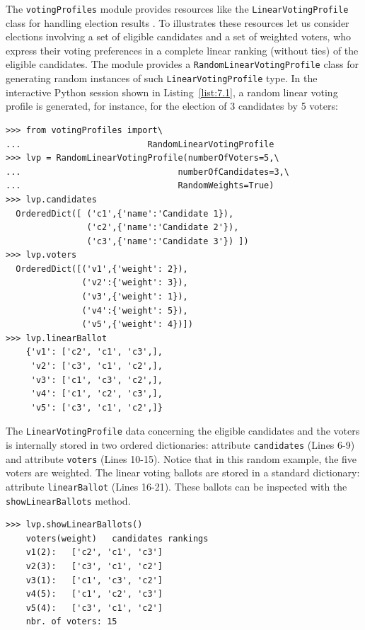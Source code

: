 The \texttt{votingProfiles} module provides resources like the \texttt{LinearVoting\-Profile} class for handling election results \citep{ADT-L2}. To illustrates these resources let us consider elections involving a set of eligible candidates and a set of weighted voters, who express their voting preferences in a complete linear ranking (without ties) of the eligible candidates. The module provides a \texttt{RandomLinear\-VotingProfile} class  for generating random instances of such \texttt{LinearVot\-ingProfile} type. In the interactive Python session shown in Listing~\vref{list:7.1}, a random linear voting profile is generated, for instance, for the election of 3 candidates by 5 voters:
\begin{lstlisting}[caption={Example of random linear voting profile},label=list:7.1]
>>> from votingProfiles import\
...                         RandomLinearVotingProfile
>>> lvp = RandomLinearVotingProfile(numberOfVoters=5,\
...                               numberOfCandidates=3,\
...                               RandomWeights=True) 
>>> lvp.candidates
  OrderedDict([ ('c1',{'name':'Candidate 1}),
                ('c2',{'name':'Candidate 2'}),
                ('c3',{'name':'Candidate 3'}) ])
>>> lvp.voters
  OrderedDict([('v1',{'weight': 2}),
               ('v2':{'weight': 3}), 
               ('v3',{'weight': 1}),
               ('v4':{'weight': 5}),
               ('v5',{'weight': 4})])
>>> lvp.linearBallot
    {'v1': ['c2', 'c1', 'c3',],
     'v2': ['c3', 'c1', 'c2',],
     'v3': ['c1', 'c3', 'c2',],
     'v4': ['c1', 'c2', 'c3',],
     'v5': ['c3', 'c1', 'c2',]} 
 \end{lstlisting}

The \texttt{LinearVotingProfile} data concerning the eligible candidates and the voters is internally stored in two ordered dictionaries: attribute \texttt{candidates} (Lines 6-9) and attribute \texttt{voters} (Lines 10-15). Notice that in this random example, the five voters are weighted. The linear voting ballots are stored in a standard dictionary: attribute \texttt{linearBallot} (Lines 16-21). These ballots can be inspected with the \texttt{showLinearBallots} method.
\begin{lstlisting}
>>> lvp.showLinearBallots()
    voters(weight)	 candidates rankings
    v1(2): 	 ['c2', 'c1', 'c3']
    v2(3): 	 ['c3', 'c1', 'c2']
    v3(1): 	 ['c1', 'c3', 'c2']
    v4(5): 	 ['c1', 'c2', 'c3']
    v5(4): 	 ['c3', 'c1', 'c2']
    nbr. of voters: 15
\end{lstlisting}


